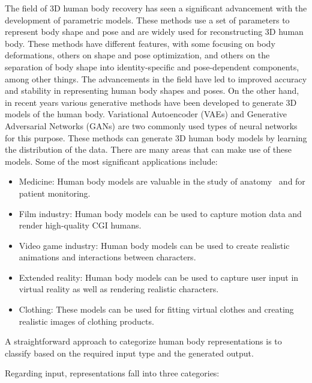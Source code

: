 The field of 3D human body recovery has seen a significant advancement with the
development of parametric models. These methods use a set of parameters to
represent body shape and pose and are widely used for reconstructing 3D human
body. These methods have different features, with some focusing on body
deformations, others on shape and pose optimization, and others on the
separation of body shape into identity-specific and pose-dependent components,
among other things. The advancements in the field have led to improved accuracy
and stability in representing human body shapes and poses. On the other hand,
in recent years various generative methods have been developed to generate 3D
models of the human body. Variational Autoencoder (VAEs) and Generative
Adversarial Networks (GANs) are two commonly used types of neural networks for
this purpose. These methods can generate 3D human body models by learning the
distribution of the data. There are many areas that can make use of these
models. Some of the most significant applications include:

\begin{itemize}
	\item Medicine: Human body models are valuable in the study of
	      anatomy~\cite{https://doi.org/10.1002/ase.1718} and for patient monitoring.
	\item Film industry: Human body models can be used to capture motion data and render
	      high-quality CGI humans.
	\item Video game industry: Human body models can be used to create realistic
	      animations and interactions between characters\cite{Starke2021}.
	\item Extended reality: Human body models can be used to capture user input in
	      virtual reality as well as rendering realistic characters.
	\item Clothing: These models can be used for fitting virtual
	      clothes\cite{apeagyei2010application} and creating realistic images of clothing
	      products.
\end{itemize}

A straightforward approach to categorize human body representations is to
classify based on the required input type and the generated output.

Regarding input, representations fall into three categories:

